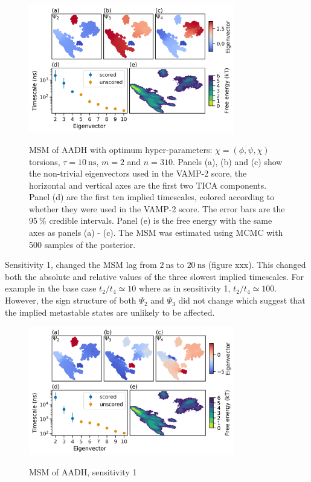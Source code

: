 \begin{figure}
    \centering
    \caption{MSM of AADH with optimum hyper-parameters: $\chi= (\phi, \psi, \chi)$ torsions, $\tau=\SI{10}{\nano\second}$, $m=2$ and $n=310$. Panels (a), (b) and (c) show the non-trivial eigenvectors used in the VAMP-2 score, the horizontal and vertical axes are the first two TICA components. Panel (d) are the first ten implied timescales, colored according to whether they were used in the VAMP-2 score. The error bars are the $\SI{95}{\percent}$ credible intervals.  Panel (e) is the free energy with the same axes as panels (a) - (c). The MSM was estimated using MCMC with 500 samples of the posterior.}
    \includegraphics[width=0.8\textwidth]{chapters/msm_optimization/figures/aadh_msm_best.png}
    \label{fig:aadh_msm_best}
\end{figure}

Sensitivity 1, changed the MSM lag from $\SI{2}{\nano\second}$ to $\SI{20}{\nano\second}$ (figure xxx). This changed both the absolute and relative values of the three slowest implied timescales. For example in the base case $t_2/t_4 \simeq 10$ where as in sensitivity 1, $t_2/t_4 \simeq 100$. However, the sign structure of both $\Psi_{2}$ and $\Psi_{3}$ did not change which suggest that the implied metastable states are unlikely to be affected.  

\begin{figure}
    \centering
    \caption{MSM of AADH, sensitivity 1}
    \includegraphics[width=0.8\textwidth]{chapters/msm_optimization/figures/aadh_msm_sens_1.png}
    \label{fig:aadh_msm_sens_1}
\end{figure}

